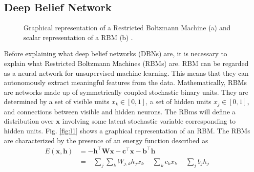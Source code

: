 \subsection{Deep Belief Network}
\label{subsec:dbn}

\begin{figure}
    \centering
    \qquad
    \caption[RBM structure.]{Graphical representation of a Restricted Boltzmann Machine (a) and scalar representation of a RBM (b) \cite{hugo_larochelle_neural_2013}.}
\end{figure}
Before explaining what deep belief networks (DBNs) are, it is necessary to explain what Restricted Boltzmann Machines (RBMs) are. RBM can be regarded as a neural network for unsupervised machine learning. This means that they can autonomously extract meaningful features from the data. Mathematically, RBMs are networks made up of symmetrically coupled stochastic binary units. They are determined by a set of visible units $x_k\in[0,1]$, a set of hidden units $x_j\in[0,1]$, and connections between visible and hidden neurons. The RBms will define a distribution over $\mathbf{x}$ involving some latent stochastic variable corresponding to hidden units. Fig. \ref{fig:l1} shows a graphical representation of an RBM. The RBMs are characterized by the presence of an energy function described as
\begin{equation}
\begin{aligned}
E(\mathbf{x}, \mathbf{h}) & =-\mathbf{h}^{\top} \mathbf{W} \mathbf{x}-\mathbf{c}^{\top} \mathbf{x}-\mathbf{b}^{\top} \mathbf{h} \\
& =-\sum_j \sum_k W_{j, k} h_j x_k-\sum_k c_k x_k-\sum_j b_j h_j
\end{aligned}
\end{equation}
